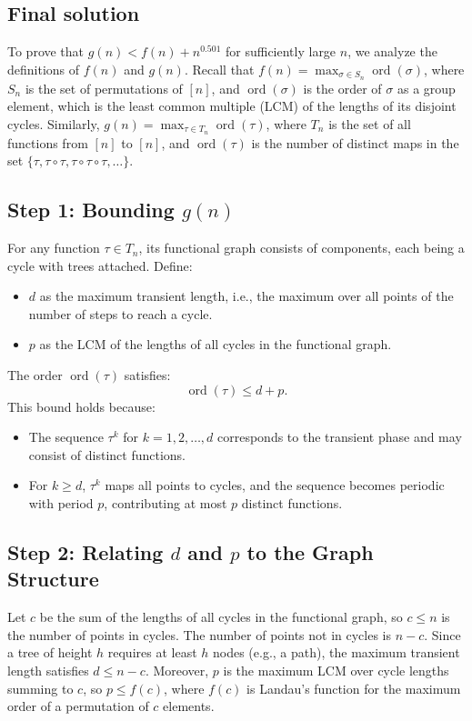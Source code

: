 \documentclass[12pt,a4paper]{article}
\theoremstyle{definition}
\begin{document}
\subsection{Final solution}
    To prove that $g(n) < f(n) + n^{0.501}$ for sufficiently large $n$, we analyze the definitions of $f(n)$ and $g(n)$. Recall that $f(n) = \max_{\sigma \in S_n} \operatorname{ord}(\sigma)$, where $S_n$ is the set of permutations of $[n]$, and $\operatorname{ord}(\sigma)$ is the order of $\sigma$ as a group element, which is the least common multiple (LCM) of the lengths of its disjoint cycles. Similarly, $g(n) = \max_{\tau \in T_n} \operatorname{ord}(\tau)$, where $T_n$ is the set of all functions from $[n]$ to $[n]$, and $\operatorname{ord}(\tau)$ is the number of distinct maps in the set $\{\tau, \tau \circ \tau, \tau \circ \tau \circ \tau, \ldots\}$.

    \subsection*{Step 1: Bounding $g(n)$}
    For any function $\tau \in T_n$, its functional graph consists of components, each being a cycle with trees attached. Define:
    \begin{itemize}
        \item $d$ as the maximum transient length, i.e., the maximum over all points of the number of steps to reach a cycle.
        \item $p$ as the LCM of the lengths of all cycles in the functional graph.
    \end{itemize}

    The order $\operatorname{ord}(\tau)$ satisfies:
    \[
        \operatorname{ord}(\tau) \leq d + p.
    \]
    This bound holds because:
    \begin{itemize}
        \item The sequence $\tau^k$ for $k = 1, 2, \ldots, d$ corresponds to the transient phase and may consist of distinct functions.
        \item For $k \geq d$, $\tau^k$ maps all points to cycles, and the sequence becomes periodic with period $p$, contributing at most $p$ distinct functions.
    \end{itemize}

    \subsection*{Step 2: Relating $d$ and $p$ to the Graph Structure}
    Let $c$ be the sum of the lengths of all cycles in the functional graph, so $c \leq n$ is the number of points in cycles. The number of points not in cycles is $n - c$. Since a tree of height $h$ requires at least $h$ nodes (e.g., a path), the maximum transient length satisfies $d \leq n - c$. Moreover, $p$ is the maximum LCM over cycle lengths summing to $c$, so $p \leq f(c)$, where $f(c)$ is Landau's function for the maximum order of a permutation of $c$ elements.
\end{document}
